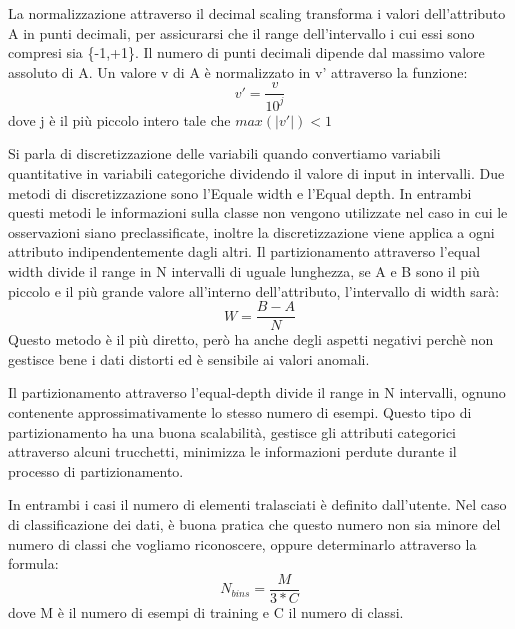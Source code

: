 \documentclass[a4paper]{extarticle}
\begin{document}
La normalizzazione attraverso il decimal scaling transforma i valori dell'attributo A in punti decimali, per assicurarsi che il range dell'intervallo i cui essi sono compresi sia \{-1,+1\}. Il numero di punti decimali dipende dal massimo valore assoluto di A. Un valore v di A è normalizzato in v' attraverso la funzione:
\begin{equation}
v'= \frac{v}{10^j}
\end{equation}
dove j è il più piccolo intero tale che $max(|v'|)<1$

Si parla di discretizzazione delle variabili quando convertiamo variabili quantitative in variabili categoriche dividendo il valore di input in intervalli. Due metodi di discretizzazione sono l'Equale width e l'Equal depth. In entrambi questi metodi le informazioni sulla classe non vengono utilizzate nel caso in cui le osservazioni siano preclassificate, inoltre la discretizzazione viene applica a ogni attributo indipendentemente dagli altri. Il partizionamento attraverso l'equal width divide il range in N intervalli di uguale lunghezza, se A e B sono il più piccolo e il più grande valore all'interno dell'attributo, l'intervallo di width sarà:
\begin{equation}
W=\frac{B-A}{N}
\end{equation}
Questo metodo è il più diretto, però ha anche degli aspetti negativi perchè non gestisce bene i dati distorti ed è sensibile ai valori anomali.

Il partizionamento attraverso l'equal-depth divide il range in N intervalli, ognuno contenente approssimativamente lo stesso numero di esempi. Questo tipo di partizionamento ha una buona scalabilità, gestisce gli attributi categorici attraverso alcuni trucchetti, minimizza le informazioni perdute durante il processo di partizionamento.

In entrambi i casi il numero di elementi tralasciati è definito dall'utente. Nel caso di classificazione dei dati, è buona pratica che questo numero non sia minore del numero di classi che vogliamo riconoscere, oppure determinarlo attraverso la formula:
\begin{equation}
N_{bins} = \frac{M}{3*C}
\end{equation}
dove M è il numero di esempi di training e C il numero di classi.
\end{document}
